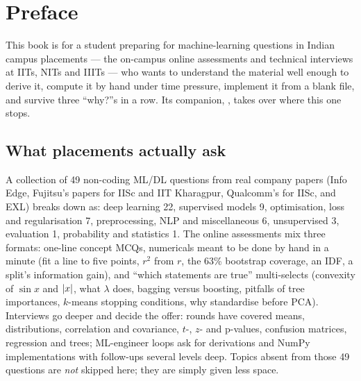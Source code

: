 \chapter*{Preface}

This book is for a student preparing for machine-learning questions in Indian campus placements --- the
on-campus online assessments and technical interviews at IITs, NITs and IIITs --- who wants to understand the
material well enough to derive it, compute it by hand under time pressure, implement it from a blank file, and
survive three ``why?''s in a row. Its companion, , takes over where this one stops.

\section*{What placements actually ask}
A collection of 49 non-coding ML/DL questions from real company papers (Info Edge, Fujitsu's papers for IISc and
IIT Kharagpur, Qualcomm's for IISc, and EXL) breaks down as: deep learning 22, supervised models 9,
optimisation, loss and regularisation 7, preprocessing, NLP and miscellaneous 6, unsupervised 3, evaluation 1,
probability and statistics 1. The online assessments mix three formats: one-line concept MCQs, numericals meant to
be done by hand in a minute (fit a line to five points, $r^2$ from $r$, the 63\% bootstrap coverage, an IDF, a
split's information gain), and ``which statements are true'' multi-selects (convexity of $\sin x$ and $\left\lvert x \right\rvert$, what
$\lambda$ does, bagging versus boosting, pitfalls of tree importances, $k$-means stopping conditions, why standardise
before PCA). Interviews go deeper and decide the offer: rounds have covered means, distributions, correlation and
covariance, $t$-, $z$- and p-values, confusion matrices, regression and trees; ML-engineer loops ask for derivations
and NumPy implementations with follow-ups several levels deep. Topics absent from those 49 questions are \emph{not}
skipped here; they are simply given less space.

